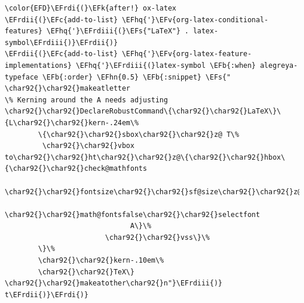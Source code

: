 \documentclass{scrartcl}
\newcommand{\EFk}[1]{\textcolor{EFk}{#1}} %
\newcommand{\EFs}[1]{\textcolor{EFs}{#1}} %
\newcommand{\EFb}[1]{\textcolor{EFb}{#1}} %
\newcommand{\EFc}[1]{\textcolor{EFc}{#1}} %
\newcommand{\EFv}[1]{\textcolor{EFv}{#1}} %
\newcommand{\EFhn}[1]{#1} %
\newcommand{\EFhq}[1]{#1} %
\newcommand{\EFrdi}[1]{#1} %
\newcommand{\EFrdii}[1]{#1} %
\newcommand{\EFrdiii}[1]{#1} %
\begin{document}
\begin{Code}
\begin{Verbatim}[]
\color{EFD}\EFrdi{(}\EFk{after!} ox-latex
\EFrdii{(}\EFc{add-to-list} \EFhq{'}\EFv{org-latex-conditional-features} \EFhq{'}\EFrdiii{(}\EFs{"LaTeX"} . latex-symbol\EFrdiii{)}\EFrdii{)}
\EFrdii{(}\EFc{add-to-list} \EFhq{'}\EFv{org-latex-feature-implementations} \EFhq{'}\EFrdiii{(}latex-symbol \EFb{:when} alegreya-typeface \EFb{:order} \EFhn{0.5} \EFb{:snippet} \EFs{"
\char92{}\char92{}makeatletter
\% Kerning around the A needs adjusting
\char92{}\char92{}DeclareRobustCommand\{\char92{}\char92{}LaTeX\}\{L\char92{}\char92{}kern-.24em\%
        \{\char92{}\char92{}sbox\char92{}\char92{}z@ T\%
         \char92{}\char92{}vbox to\char92{}\char92{}ht\char92{}\char92{}z@\{\char92{}\char92{}hbox\{\char92{}\char92{}check@mathfonts
                              \char92{}\char92{}fontsize\char92{}\char92{}sf@size\char92{}\char92{}z@
                              \char92{}\char92{}math@fontsfalse\char92{}\char92{}selectfont
                              A\}\%
                        \char92{}\char92{}vss\}\%
        \}\%
        \char92{}\char92{}kern-.10em\%
        \char92{}\char92{}TeX\}
\char92{}\char92{}makeatother\char92{}n"}\EFrdiii{)} t\EFrdii{)}\EFrdi{)}
\end{Verbatim}
\end{Code}
\end{document}
